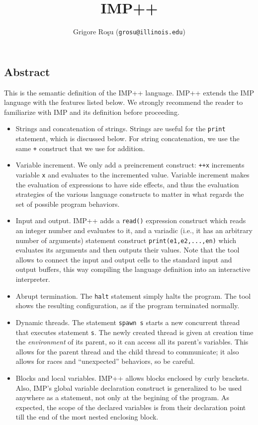 \setlength{\parindent}{1em}
\title{IMP++}
\author{Grigore Ro\c{s}u (\texttt{grosu@illinois.edu})}

\maketitle

\begin{latexComment}
\section{Abstract}
This is the \K semantic definition of the IMP++ language.
IMP++ extends the IMP language with the features listed below.  We
strongly recommend the reader to familiarize with IMP and its \K
definition before proceeding.
\begin{itemize}
\item Strings and concatenation of strings.  Strings are useful
for the \texttt{print} statement, which is discussed below.  For
string concatenation, we use the same \texttt{+} construct that we use
for addition.
\item Variable increment.  We only add a preincrement construct:
\texttt{++x} increments variable \texttt{x} and evaluates to the
incremented value.  Variable increment makes the evaluation of
expressions to have side effects, and thus the evaluation strategies
of the various language constructs to matter in what regards the set
of possible program behaviors.
\item Input and output.  IMP++ adds a \texttt{read()} expression
construct which reads an integer number and evaluates to it, and 
a variadic (i.e., it has an arbitrary number of arguments) statement
construct \texttt{print(e1,e2,...,en)} which evaluates its arguments
and then outputs their values.  Note that the \K tool allows to
connect the input and output cells to the standard input and output
buffers, this way compiling the language definition into an
interactive interpreter.
\item Abrupt termination.  The \texttt{halt} statement simply halts
the program.  The \K tool shows the resulting configuration, as if the
program terminated normally.
\item Dynamic threads. The statement \texttt{spawn s} starts a new
concurrent thread that executes statement \texttt{s}.  The newly
created thread is given at creation time the {\em environment} of its
parent, so it can access all its parent's variables.  This allows for
the parent thread and the child thread to communicate; it also allows
for races and ``unexpected'' behaviors, so be careful.
\item Blocks and local variables.  IMP++ allows blocks enclosed by 
curly brackets.  Also, IMP's global variable declaration construct is
generalized to be used anywhere as a statement, not only at the
begining of the program.  As expected, the scope of the declared
variables is from their declaration point till the end of the most
nested enclosing block.
\end{itemize}

\end{latexComment}

\vspace*{3ex}
